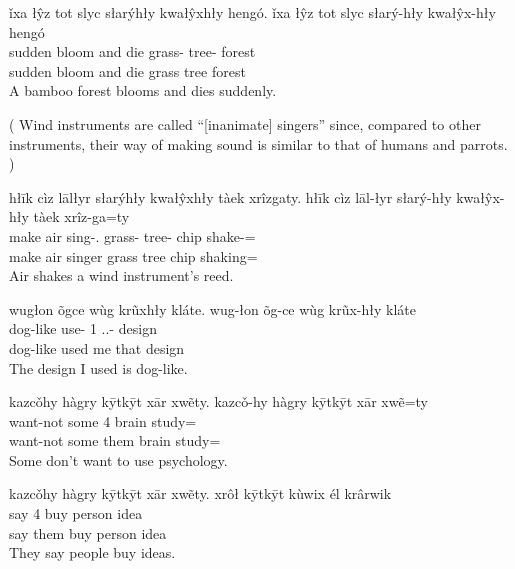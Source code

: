 \begin{exe}
    \ex
    ǐxa łŷz tot slyc słarýhły kwałŷxhły hengó.
    \glll
    ǐxa łŷz tot slyc słarý-hły kwałŷx-hły hengó \\
    sudden bloom and die grass-\Adj{} tree-\Adj{} forest \\
    sudden bloom and die grass tree forest \\
    \glt
    A bamboo forest blooms and dies suddenly.
\end{exe}

(
Wind instruments are called ``[inanimate] singers''
since, compared to other instruments,
their way of making sound is similar to that of humans and parrots.
)
\begin{exe}
    \ex
    hłīk cìz lālłyr słarýhły kwałŷxhły tàek xrîzgaty.
    \glll
    hłīk cìz lāl-łyr słarý-hły kwałŷx-hły tàek xrîz-ga=ty \\
    make air sing-\Agt{}.\Inanim{} grass-\Adj{} tree-\Adj{} chip shake-\Ger{}=\Poss{} \\
    make air singer grass tree chip shaking=\Poss{} \\
    \glt
    Air shakes a wind instrument's reed.
\end{exe}

\begin{exe}
    \ex
    wugłon õgce wùg krũxhły kláte.
    \glll
    wug-łon õg-ce wùg krũx-hły kláte \\
    dog-like use-\Pst{} 1\Sg{} \Dem{}.\Inanim{}.\Dist{}-\Adj{} design \\
    dog-like used me that design \\
    \glt
    The design I used is dog-like.
\end{exe}

\begin{exe}
    \ex
    kazcǒhy hàgry kȳtkȳt xār xwẽty.
    \glll
    kazcǒ-hy hàgry kȳtkȳt xār xwẽ=ty \\
    want-not some 4\Pl{} brain study=\Poss{} \\
    want-not some them brain study=\Poss{} \\
    \glt
    Some don't want to use psychology.
\end{exe}

\begin{exe}
    \ex
    kazcǒhy hàgry kȳtkȳt xār xwẽty.
    \glll
    xrôł kȳtkȳt kùwix él krârwik \\
    say 4\Pl{} buy person idea \\
    say them buy person idea \\
    \glt
    They say people buy ideas.
\end{exe}

